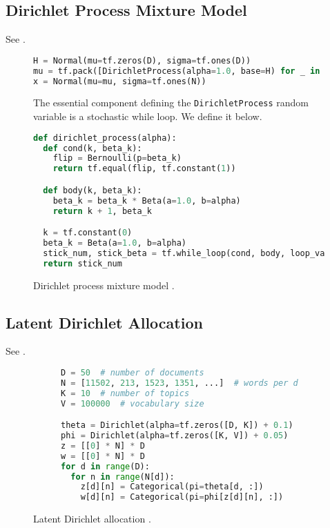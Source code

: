 \subsection{Dirichlet Process Mixture Model}
\label{appendix:dirichlet_process}

See .

\begin{figure}[!h]
\begin{lstlisting}[language=python]
H = Normal(mu=tf.zeros(D), sigma=tf.ones(D))
mu = tf.pack([DirichletProcess(alpha=1.0, base=H) for _ in range(N)])
x = Normal(mu=mu, sigma=tf.ones(N))
\end{lstlisting}
The essential component defining the \texttt{DirichletProcess} random
variable is a stochastic while loop. We define it below.
\begin{lstlisting}[language=python]
def dirichlet_process(alpha):
  def cond(k, beta_k):
    flip = Bernoulli(p=beta_k)
    return tf.equal(flip, tf.constant(1))

  def body(k, beta_k):
    beta_k = beta_k * Beta(a=1.0, b=alpha)
    return k + 1, beta_k

  k = tf.constant(0)
  beta_k = Beta(a=1.0, b=alpha)
  stick_num, stick_beta = tf.while_loop(cond, body, loop_vars=[k, beta_k])
  return stick_num
\end{lstlisting}
\caption{Dirichlet process mixture model .}
\label{fig:dp}
\end{figure}

\subsection{Latent Dirichlet Allocation}
\label{appendix:lda}

See .

\begin{figure}[!h]
\begin{subfigure}{0.45\columnwidth}
  \centering
  
\end{subfigure}%
\begin{subfigure}{0.55\columnwidth}
\begin{lstlisting}[language=python]
D = 50  # number of documents
N = [11502, 213, 1523, 1351, ...]  # words per doc
K = 10  # number of topics
V = 100000  # vocabulary size

theta = Dirichlet(alpha=tf.zeros([D, K]) + 0.1)
phi = Dirichlet(alpha=tf.zeros([K, V]) + 0.05)
z = [[0] * N] * D
w = [[0] * N] * D
for d in range(D):
  for n in range(N[d]):
    z[d][n] = Categorical(pi=theta[d, :])
    w[d][n] = Categorical(pi=phi[z[d][n], :])
\end{lstlisting}
\end{subfigure}
\caption{Latent Dirichlet allocation \citep{blei2003latent}.}
\label{fig:lda}
\end{figure}

